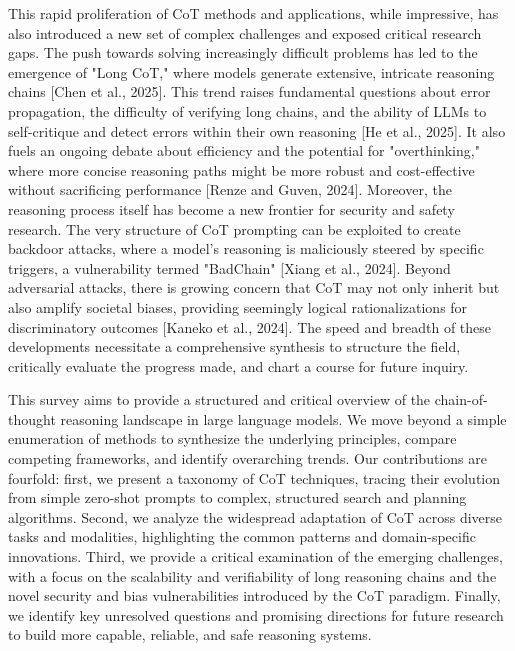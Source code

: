\documentclass[11pt]{article}
\begin{document}
This rapid proliferation of CoT methods and applications, while impressive, has also introduced a new set of complex challenges and exposed critical research gaps. The push towards solving increasingly difficult problems has led to the emergence of "Long CoT," where models generate extensive, intricate reasoning chains [Chen et al., 2025]. This trend raises fundamental questions about error propagation, the difficulty of verifying long chains, and the ability of LLMs to self-critique and detect errors within their own reasoning [He et al., 2025]. It also fuels an ongoing debate about efficiency and the potential for "overthinking," where more concise reasoning paths might be more robust and cost-effective without sacrificing performance [Renze and Guven, 2024]. Moreover, the reasoning process itself has become a new frontier for security and safety research. The very structure of CoT prompting can be exploited to create backdoor attacks, where a model's reasoning is maliciously steered by specific triggers, a vulnerability termed "BadChain" [Xiang et al., 2024]. Beyond adversarial attacks, there is growing concern that CoT may not only inherit but also amplify societal biases, providing seemingly logical rationalizations for discriminatory outcomes [Kaneko et al., 2024]. The speed and breadth of these developments necessitate a comprehensive synthesis to structure the field, critically evaluate the progress made, and chart a course for future inquiry.

This survey aims to provide a structured and critical overview of the chain-of-thought reasoning landscape in large language models. We move beyond a simple enumeration of methods to synthesize the underlying principles, compare competing frameworks, and identify overarching trends. Our contributions are fourfold: first, we present a taxonomy of CoT techniques, tracing their evolution from simple zero-shot prompts to complex, structured search and planning algorithms. Second, we analyze the widespread adaptation of CoT across diverse tasks and modalities, highlighting the common patterns and domain-specific innovations. Third, we provide a critical examination of the emerging challenges, with a focus on the scalability and verifiability of long reasoning chains and the novel security and bias vulnerabilities introduced by the CoT paradigm. Finally, we identify key unresolved questions and promising directions for future research to build more capable, reliable, and safe reasoning systems.
\end{document}
